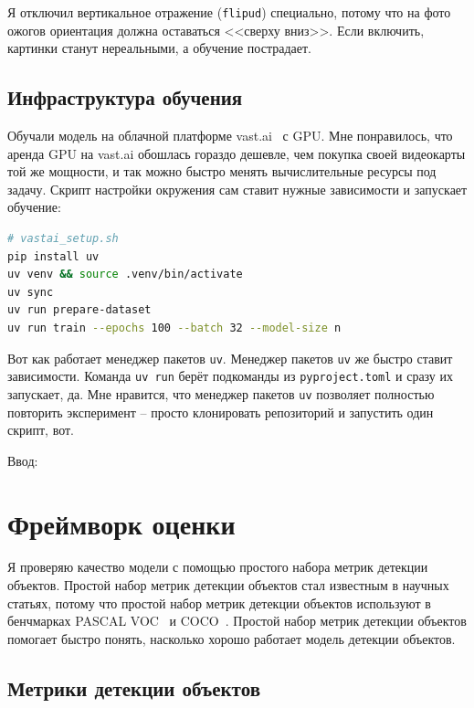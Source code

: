 Я отключил вертикальное отражение (\texttt{flipud}) специально, потому что на фото ожогов ориентация должна оставаться <<сверху вниз>>. Если включить, картинки станут нереальными, а обучение пострадает.

\subsection{Инфраструктура обучения}

Обучали модель на облачной платформе vast.ai~\cite{vastai2023} с GPU. Мне понравилось, что аренда GPU на vast.ai обошлась гораздо дешевле, чем покупка своей видеокарты той же мощности, и так можно быстро менять вычислительные ресурсы под задачу. Скрипт настройки окружения сам ставит нужные зависимости и запускает обучение:

\begin{lstlisting}[language=bash, caption={Скрипт, который настраивает окружение и запускает обучение на vast.ai}, label=lst:vastai]
# vastai_setup.sh
pip install uv
uv venv && source .venv/bin/activate
uv sync
uv run prepare-dataset
uv run train --epochs 100 --batch 32 --model-size n
\end{lstlisting}

Вот как работает менеджер пакетов \texttt{uv}. Менеджер пакетов \texttt{uv} же быстро ставит зависимости. Команда \texttt{uv run} берёт подкоманды из \texttt{pyproject.toml} и сразу их запускает, да. Мне нравится, что менеджер пакетов \texttt{uv} позволяет полностью повторить эксперимент – просто клонировать репозиторий и запустить один скрипт, вот.

Ввод:

\section{Фреймворк оценки}

Я проверяю качество модели с помощью простого набора метрик детекции объектов. Простой набор метрик детекции объектов стал известным в научных статьях, потому что простой набор метрик детекции объектов используют в бенчмарках PASCAL VOC~\cite{everingham2010pascal} и COCO~\cite{lin2014coco}. Простой набор метрик детекции объектов помогает быстро понять, насколько хорошо работает модель детекции объектов.

\subsection{Метрики детекции объектов}

